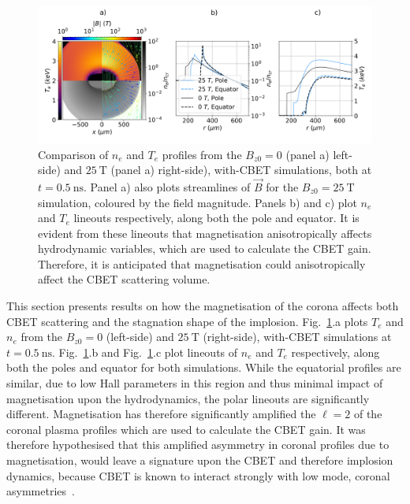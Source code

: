 \begin{figure}[t!]
    \includegraphics[width=\linewidth]{Results2/Images/ne_te_Bstream_comp_alt050.png}
    \centering
    \caption{Comparison of $n_e$ and $T_e$ profiles from the $B_{z0}=0$ (panel a) left-side) and $25\ \text{T}$ (panel a) right-side), with-\ac{CBET} simulations, both at $t=0.5\ \text{ns}$.
    Panel a) also plots streamlines of $\vec{B}$ for the $B_{z0}=25\ \text{T}$ simulation, coloured by the field magnitude.
    Panels b) and c) plot $n_e$ and $T_e$ lineouts respectively, along both the pole and equator.
    It is evident from these lineouts that magnetisation anisotropically affects hydrodynamic variables, which are used to calculate the \ac{CBET} gain.
    Therefore, it is anticipated that magnetisation could anisotropically affect the \ac{CBET} scattering volume.}%
    \label{fig:Res2_ne_te_Bstream_comp_alt050}
\end{figure}

This section presents results on how the magnetisation of the corona affects both \ac{CBET} scattering and the stagnation shape of the implosion.
Fig.~\ref{fig:Res2_ne_te_Bstream_comp_alt050}.a plots $T_e$ and $n_e$ from the $B_{z0}=0$ (left-side) and $25\ \text{T}$ (right-side), with-\ac{CBET} simulations at $t=0.5\ \text{ns}$.
Fig.~\ref{fig:Res2_ne_te_Bstream_comp_alt050}.b and Fig.~\ref{fig:Res2_ne_te_Bstream_comp_alt050}.c plot lineouts of $n_e$ and $T_e$ respectively, along both the poles and equator for both simulations.
While the equatorial profiles are similar, due to low Hall parameters in this region and thus minimal impact of magnetisation upon the hydrodynamics, the polar lineouts are significantly different.
Magnetisation has therefore significantly amplified the $\ell=2$ of the coronal plasma profiles which are used to calculate the \ac{CBET} gain.
It was therefore hypothesised that this amplified asymmetry in coronal profiles due to magnetisation, would leave a signature upon the \ac{CBET} and therefore implosion dynamics, because \ac{CBET} is known to interact strongly with low mode, coronal asymmetries~\cite{anderson_effect_2020}.

